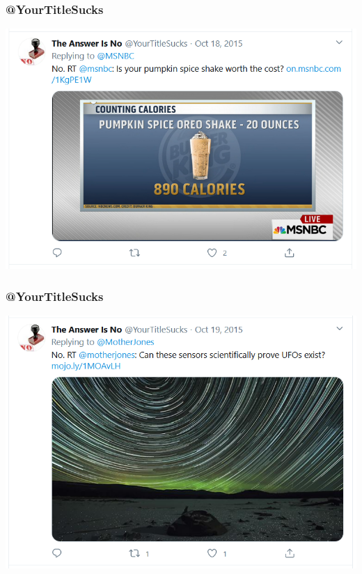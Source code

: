 \documentclass{beamer}
\begin{document}
    \begin{frame}
        \frametitle{@YourTitleSucks}
    
        \begin{center}
            \includegraphics[width=0.8\linewidth]{pumpkin_spice.png}
        \end{center}
    
    \end{frame}
    \begin{frame}
        \frametitle{@YourTitleSucks}
    
        \begin{center}
            \includegraphics[width=0.8\linewidth]{ufo.png}
        \end{center}
    
    \end{frame}
\end{document}
